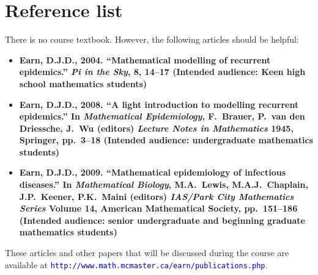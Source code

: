 \documentclass[12pt]{article}
\newcommand{\url}[1]{{\tt\textcolor{blue}{#1}}}
\begin{document}
\section*{Reference list}
There is no course textbook.  However, the following articles should be helpful:

\def\me{\bf Earn, D.J.D.\rm}
\def\vol#1{{\bf#1}}
\def\pp#1{{#1}}
\begin{itemize}

\item {}\me, 2004. ``Mathematical modelling of recurrent epidemics.'' 
{\it Pi in the Sky\/}, \vol{8}, 14--17\qquad
(Intended audience: Keen high school mathematics students)

\item{}\me, 2008. ``A light introduction to modelling recurrent epidemics.'' In {\it Mathematical Epidemiology\/}, F.\ Brauer, P.\ van den Driessche, J.\ Wu (editors) {\it Lecture Notes in Mathematics\/} \vol{1945}, Springer, pp.\ 3--18\qquad
(Intended audience: undergraduate mathematics students)

\item{}\me, 2009.  ``Mathematical epidemiology of infectious diseases.'' In {\it Mathematical Biology\/}, M.A.\ Lewis, M.A.J.\ Chaplain, J.P.\ Keener, P.K.\ Maini (editors) {\it IAS/Park City Mathematics Series\/} Volume {\bf 14}, American Mathematical Society, pp.\ 151--186\qquad
(Intended audience: senior undergraduate and beginning graduate mathematics students)

\end{itemize}

\noindent
These articles and other papers that will be discussed during the course are available at \url{http://www.math.mcmaster.ca/earn/publications.php}.

\end{document}
